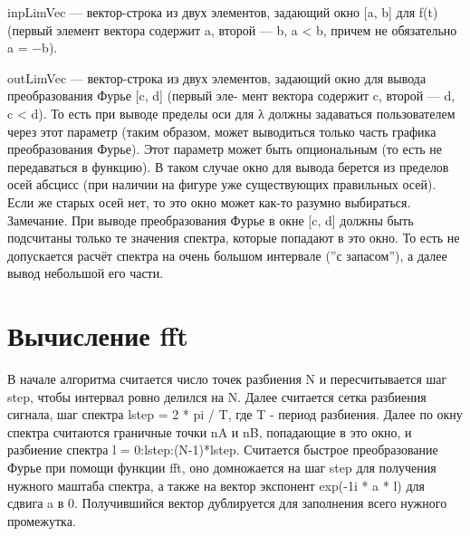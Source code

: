 \documentclass[11pt]{article}
\begin{document}
inpLimVec — вектор-строка из двух элементов, задающий окно [a, b] для f(t) (первый элемент вектора содержит a,
второй — b, a < b, причем не обязательно a = −b).
\newline

outLimVec — вектор-строка из двух элементов, задающий окно для вывода преобразования Фурье [c, d] (первый эле-
мент вектора содержит c, второй — d, c < d). То есть при выводе пределы оси для λ должны задаваться
пользователем через этот параметр (таким образом, может выводиться только часть графика преобразования
Фурье). Этот параметр может быть опциональным (то есть не передаваться в функцию). В таком случае окно
для вывода берется из пределов осей абсцисс (при наличии на фигуре уже существующих правильных осей).
Если же старых осей нет, то это окно может как-то разумно выбираться.
Замечание. При выводе преобразования Фурье в окне [c, d] должны быть подсчитаны только те значения
спектра, которые попадают в это окно. То есть не допускается расчёт спектра на очень большом интервале (”с
запасом”), а далее вывод небольшой его части.



\section{Вычисление fft}

В начале алгоритма считается число точек разбиения N и пересчитывается шаг step, чтобы интервал ровно делился на N. Далее считается сетка разбиения сигнала, шаг спектра lstep = 2 * pi / T, где T - период разбиения. Далее по окну спектра считаются граничные точки nA и nB, попадающие в это окно, и разбиение спектра l = 0:lstep:(N-1)*lstep. Считается быстрое преобразование Фурье при помощи функции fft, оно домножается на шаг step для получения нужного маштаба спектра, а также на вектор экспонент exp(-1i * a * l) для сдвига a в 0. Получившийся вектор дублируется для заполнения всего нужного промежутка.
\end{document}
